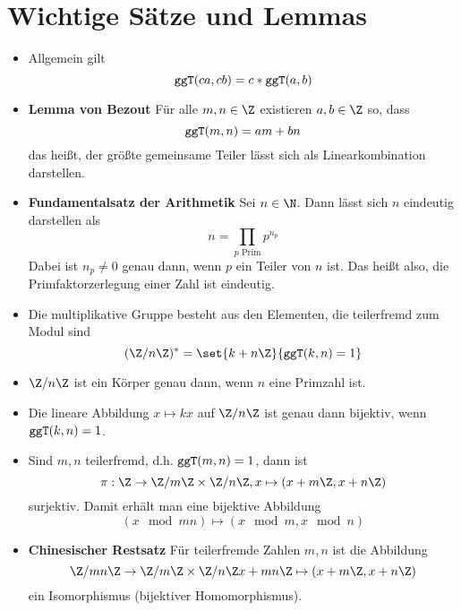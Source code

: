 \section{Wichtige Sätze und Lemmas}
\begin{itemize}
	\item Allgemein gilt
	\begin{equation*}
		\texttt{ggT}(ca,cb)=c*\texttt{ggT}(a,b)
	\end{equation*}
	\item \textbf{Lemma von Bezout}
	Für alle $m,n\in\Z$ existieren $a,b\in\Z$ so, dass
	\begin{equation*}
		\texttt{ggT}(m,n)=am+bn
	\end{equation*}
	das heißt, der größte gemeinsame Teiler lässt sich als Linearkombination darstellen.
	\item \textbf{Fundamentalsatz der Arithmetik} Sei $n\in\N$. Dann lässt sich $n$ eindeutig darstellen als
	\begin{equation*}
		n=\prod_{p\text{ Prim}}  p^{n_p}
	\end{equation*}
	Dabei ist $n_p\neq 0$ genau dann, wenn $p$ ein Teiler von $n$ ist. Das heißt also, die Primfaktorzerlegung einer Zahl ist eindeutig.
	\item Die multiplikative Gruppe besteht aus den Elementen, die teilerfremd zum Modul sind
	\begin{equation*}
		(\Z/n\Z)^\ast =\set{k+n\Z}{\ggT(k,n)=1}
	\end{equation*}
	\item $\Z/n\Z$ ist ein Körper genau dann, wenn $n$ eine Primzahl ist.

	\item Die lineare Abbildung $x\mapsto kx$ auf $\Z/n\Z$ ist genau dann bijektiv, wenn $\texttt{ggT}(k,n)=1$.
	
	\item Sind $m,n$ teilerfremd, d.h. $\texttt{ggT}(m,n)=1$, dann ist
	\begin{equation*}
		\pi:\Z\rightarrow\Z/m\Z\times\Z/n\Z, x\mapsto(x+m\Z,x+n\Z)
	\end{equation*}
	surjektiv. Damit erhält man eine bijektive Abbildung
	\begin{equation*}
		(x\mod mn)\mapsto (x\mod m,x\mod n)
	\end{equation*}
	\item \textbf{Chinesischer Restsatz}
	Für teilerfremde Zahlen $m,n$ ist die Abbildung
	\begin{equation*}
		\Z/mn\Z\rightarrow \Z/m\Z\times \Z/n\Z
		x+mn\Z\mapsto (x+m\Z,x+n\Z)
	\end{equation*}
	ein Isomorphismus (bijektiver Homomorphismus).


\end{itemize}
